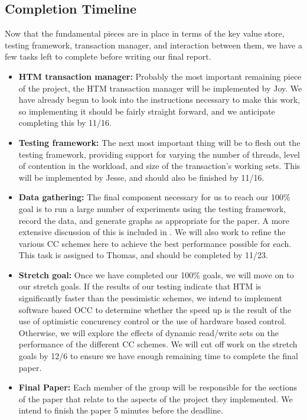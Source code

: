 \subsection{Completion Timeline}
Now that the fundamental pieces are in place in terms of the key value store, 
testing framework, transaction manager, and interaction between them, we have 
a few tasks left to complete before writing our final report.
\begin{itemize}
\item \textbf{HTM transaction manager:} Probably the most important remaining 
piece of the project, the HTM transaction manager will be implemented by Joy. 
We have already begun to look into the instructions necessary to make this 
work, so implementing it should be fairly straight forward, and we anticipate 
completing this by 11/16.
\item \textbf{Testing framework:} The next most important thing will be to 
flesh out the testing framework, providing support for varying the number of 
threads, level of contention in the workload, and size of the transaction's 
working sets. This will be implemented by Jesse, and should also be finished by 
11/16.
\item \textbf{Data gathering:} The final component necessary for us to reach 
our 100\% goal is to run a large number of experiments using the testing 
framework, record the data, and generate graphs as appropriate for the paper. 
A more extensive discussion of this is included in . We will 
also work to refine the various CC schemes here to achieve the best performance 
possible for each. This task is assigned to Thomas, and should be completed by 
11/23.
\item \textbf{Stretch goal:} Once we have completed our 100\% goals, we will 
move on to our stretch goals. If the results of our testing indicate that HTM 
is significantly faster than the pessimistic schemes, we intend to implement 
software based OCC to determine whether the speed up is the result of the use 
of optimistic concurency control or the use of hardware based control. 
Otherwise, we will explore the effects of dynamic read/write sets on the 
performance of the different CC schemes. We will cut off work on the stretch 
goals by 12/6 to ensure we have enough remaining time to complete the final 
paper.
\item \textbf{Final Paper:} Each member of the group will be responsible for 
the sections of the paper that relate to the aspects of the project they 
implemented. We intend to finish the paper 5 minutes before the deadline.
\end{itemize}

